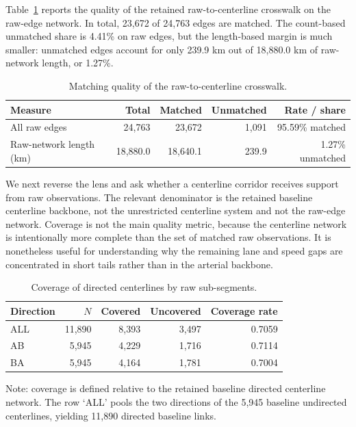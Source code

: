 \documentclass[12pt]{article}
\begin{document}
	Table~\ref{tab:match-summary-v11} reports the quality of the retained raw-to-centerline crosswalk on the raw-edge network. In total, 23,672 of 24,763 edges are matched. The count-based unmatched share is 4.41\% on raw edges, but the length-based margin is much smaller: unmatched edges account for only 239.9 km out of 18,880.0 km of raw-network length, or 1.27\%.
	
	\begin{table}[h!]
		\centering
		\caption{Matching quality of the raw-to-centerline crosswalk.}
		\label{tab:match-summary-v11}
		\begin{tabular}{l r r r r}
			\toprule
			Measure & Total & Matched & Unmatched & Rate / share \\
			\midrule
			All raw edges & 24,763 & 23,672 & 1,091 & 95.59\% matched \\
			Raw-network length (km) & 18,880.0 & 18,640.1 & 239.9 & 1.27\% unmatched \\
			\bottomrule
		\end{tabular}
	\end{table}
	
	We next reverse the lens and ask whether a centerline corridor receives support from raw observations. The relevant denominator is the retained baseline centerline backbone, not the unrestricted centerline system and not the raw-edge network. Coverage is not the main quality metric, because the centerline network is intentionally more complete than the set of matched raw observations. It is nonetheless useful for understanding why the remaining lane and speed gaps are concentrated in short tails rather than in the arterial backbone.
	
	\begin{table}[h!]
		\centering
		\caption{Coverage of directed centerlines by raw sub-segments.}
		\label{tab:directed-coverage}
		\begin{tabular}{l r r r r}
			\toprule
			Direction & $N$ & Covered & Uncovered & Coverage rate \\
			\midrule
			ALL & 11,890 & 8,393 & 3,497 & 0.7059 \\
			AB  & 5,945 & 4,229 & 1,716 & 0.7114 \\
			BA  & 5,945 & 4,164 & 1,781 & 0.7004 \\
			\bottomrule
		\end{tabular}
		\vspace{0.3em}
		\begin{minipage}{\textwidth}
			\footnotesize
			\raggedright
			Note: coverage is defined relative to the retained baseline directed centerline network. The row `ALL' pools the two directions of the 5,945 baseline undirected centerlines, yielding 11,890 directed baseline links.
		\end{minipage}
	\end{table}
	
\end{document}
